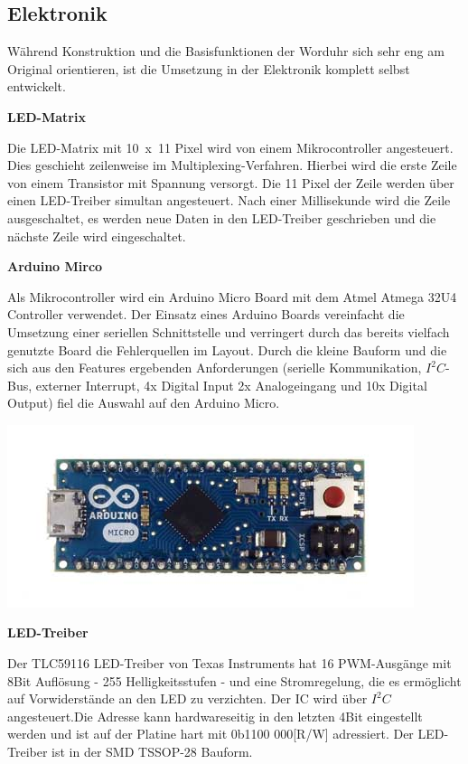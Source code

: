 \begin{multicols}{2}
\section{Elektronik}
\label{sec:Elektronik}
Während Konstruktion und die Basisfunktionen der Worduhr sich sehr eng am Original orientieren, ist die Umsetzung in der Elektronik komplett selbst entwickelt.

\textbf{LED-Matrix}

Die LED-Matrix mit 10~x~11 Pixel wird von einem Mikrocontroller angesteuert. Dies geschieht zeilenweise im Multiplexing-Verfahren. Hierbei wird die erste Zeile von einem Transistor mit Spannung versorgt. Die 11 Pixel der Zeile werden über einen LED-Treiber simultan angesteuert. Nach einer Millisekunde wird die Zeile ausgeschaltet, es werden neue Daten in den LED-Treiber geschrieben und die nächste Zeile wird eingeschaltet. 

\textbf{Arduino Mirco}

Als Mikrocontroller wird ein Arduino Micro Board mit dem Atmel Atmega 32U4 Controller verwendet. Der Einsatz eines Arduino Boards vereinfacht die Umsetzung einer seriellen Schnittstelle und verringert durch das bereits vielfach genutzte Board die Fehlerquellen im Layout. Durch die kleine Bauform und die sich aus den Features ergebenden Anforderungen (serielle Kommunikation, $I^{2}C$-Bus, externer Interrupt, 4x Digital Input 2x Analogeingang und 10x Digital Output) fiel die Auswahl auf den Arduino Micro.

\includegraphics[width=\columnwidth]{Abbildungen/Elektronik/ArduinoMicro}

\textbf{LED-Treiber}

Der TLC59116 LED-Treiber von Texas Instruments hat 16 PWM-Ausgänge mit 8Bit Auflösung - 255 Helligkeitsstufen - und eine Stromregelung, die es ermöglicht auf Vorwiderstände an den LED zu verzichten. Der IC wird über $I^{2}C$ angesteuert.Die Adresse kann hardwareseitig in den letzten 4Bit eingestellt werden und ist auf der Platine hart mit 0b1100 000[R/W] adressiert. Der LED-Treiber ist in der SMD TSSOP-28 Bauform.


\end{multicols}
